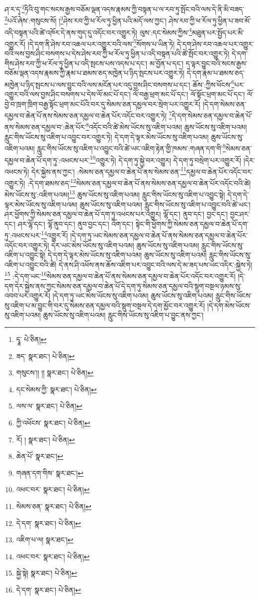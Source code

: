 ཤ་ར་དྭ་\footnote{དྭཱ་  པེ་ཅིན། }ཏིའི་བུ་གང་སངས་རྒྱས་བཅོམ་ལྡན་འདས་རྣམས་ཀྱི་བསྟན་པ་ལ་རབ་ཏུ་སྤོང་བའི་ལས་དེ་ནི་མི་བཟད་\footnote{ཟད་  སྣར་ཐང་།  པེ་ཅིན། }པའོ་ཞེས་:གསུངས་སོ། །\footnote{གསུངས་།། །།  སྣར་ཐང་།  པེ་ཅིན། }ཤེས་རབ་ཀྱི་ཕ་རོལ་ཏུ་ཕྱིན་པའི་མདོ་ལས་ཀྱང་། ཤེས་རབ་ཀྱི་ཕ་རོལ་ཏུ་ཕྱིན་པ་ཟབ་མོ་འདི་བསྟན་པའི་ཚེ་འཁོར་དེ་ནས་གུད་དུ་འདོང་བར་འགྱུར་ཏེ། ལུས་:དང་སེམས་ཀྱིས་\footnote{དང་སེམས་ཀྱི་  སྣར་ཐང་།  པེ་ཅིན། }མཐུན་པར་སྤྱོད་པར་མི་འགྱུར་རོ། །དེ་དག་ནི་ཤེས་རབ་འཆལ་པར་འགྱུར་བའི་ལས་\footnote{ལས་ལ་  སྣར་ཐང་།  པེ་ཅིན། }སོགས་པ་ཡིན་ཏེ། དེ་དག་ཤེས་རབ་འཆལ་པར་འགྱུར་བའི་ལས་བྱས་ཤིང་བསགས་པ་དེས་ཤེས་རབ་ཀྱི་ཕ་རོལ་ཏུ་ཕྱིན་པ་འདི་བསྟན་པའི་ཚེ་སྤོང་བར་འགྱུར་ཏེ། དེ་དག་གིས་ཤེས་རབ་ཀྱི་ཕ་རོལ་ཏུ་ཕྱིན་པ་འདི་སྤངས་པས་འདས་པ་དང་། མ་བྱོན་པ་དང་། ད་ལྟར་བྱུང་བའི་སངས་རྒྱས་བཅོམ་ལྡན་འདས་རྣམས་ཀྱི་རྣམ་པ་ཐམས་ཅད་མཁྱེན་པ་ཉིད་སྤངས་པར་འགྱུར་ཏེ། དེ་དག་རྣམ་པ་ཐམས་ཅད་མཁྱེན་པ་ཉིད་སྤངས་པ་ལས་བྱུང་བའི་ལས་མངོན་པར་འདུ་བྱས་ཤིང་བསགས་པ་དང་། ཆོས་:ཀྱིས་ཕོངས་\footnote{ཀྱི་འཕོངས་  སྣར་ཐང་།  པེ་ཅིན། }པར་འགྱུར་བའི་ལས་བྱས་ཤིང་བསགས་པ་དེས་ལོ་མང་པོ་དང་། ལོ་བརྒྱ་ཕྲག་མང་པོ་དང་། ལོ་སྟོང་ཕྲག་མང་པོ་དང་། ལོ་བྱེ་བ་ཁྲག་ཁྲིག་བརྒྱ་སྟོང་ཕྲག་མང་པོའི་བར་དུ་སེམས་ཅན་དམྱལ་བར་སྲེག་པར་འགྱུར་རོ། །དེ་དག་སེམས་ཅན་དམྱལ་བ་ཆེན་པོ་ནས་སེམས་ཅན་དམྱལ་བ་ཆེན་པོར་འདོང་བར་འགྱུར་ཏེ། \footnote{རོ། །   སྣར་ཐང་།  པེ་ཅིན། }དེ་དག་སེམས་ཅན་དམྱལ་བ་ཆེན་པོ་ནས་སེམས་ཅན་དམྱལ་བ་:ཆེན་པོར་\footnote{ཆེན་པོ་  སྣར་ཐང་། }འདོང་བའི་ཚེ་མེས་ཡོངས་སུ་འཇིག་པའམ། ཆུས་ཡོངས་སུ་འཇིག་པའམ། རླུང་གིས་ཡོངས་སུ་འཇིག་པ་འབྱུང་བར་འགྱུར་ཏེ། དེ་དག་དེ་ལྟར་མེས་ཡོངས་སུ་འཇིག་པའམ། ཆུས་ཡོངས་སུ་འཇིག་པའམ། རླུང་གིས་ཡོངས་སུ་འཇིག་པ་འབྱུང་བའི་ཚེ་ཡང་འཇིག་རྟེན་གྱི་ཁམས་:གཞན་དག་གི་\footnote{གཞན་དག་གིས་  སྣར་ཐང་། }སེམས་ཅན་དམྱལ་བ་ཆེན་པོ་དག་ཏུ་:འཕངས་པར་\footnote{འཕང་བར་  སྣར་ཐང་།  པེ་ཅིན། }འགྱུར་ཏེ། དེ་དག་ཏུ་སྐྱེ་བར་འགྱུར། དེ་དག་ཏུ་བསྲེག་པར་འགྱུར་རོ། །དེར་འཕངས་ཏེ། དེར་སྐྱེས་ནས་ཀྱང་། :སེམས་ཅན་དམྱལ་བ་ཆེན་པོ་ནས་སེམས་ཅན་\footnote{སེམས་ཅན་  སྣར་ཐང་།  པེ་ཅིན། }དམྱལ་བ་ཆེན་པོར་འདོང་བར་འགྱུར་ཏེ། :དེ་དག་ཐམས་ཅད་\footnote{དེ་དག་  སྣར་ཐང་།  པེ་ཅིན། }སེམས་ཅན་དམྱལ་བ་ཆེན་པོ་ནས་སེམས་ཅན་དམྱལ་བ་ཆེན་པོར་འདོང་བའི་ཚེ། མེས་ཡོངས་སུ་:འཇིག་པའམ།\footnote{འཇིག་པ་ལ།  སྣར་ཐང་། } ཆུས་ཡོངས་སུ་འཇིག་པའམ། རླུང་གིས་ཡོངས་སུ་འཇིག་པ་འབྱུང་སྟེ། དེ་དག་དེ་ལྟར་མེས་ཡོངས་སུ་འཇིག་པའམ། ཆུས་ཡོངས་སུ་འཇིག་པའམ། རླུང་གིས་ཡོངས་སུ་འཇིག་པ་འབྱུང་བའི་ཚེ་ཡང་། ཤར་ཕྱོགས་ཀྱི་སེམས་ཅན་དམྱལ་བ་ཆེན་པོ་དག་ཏུ་འཕངས་པར་འགྱུར། ལྷོ་དང་། ནུབ་དང་། བྱང་དང་། བྱང་ཤར་དང་། ཤར་ལྷོ་དང་། ལྷོ་ནུབ་དང་། ནུབ་བྱང་དང་། འོག་དང་། སྟེང་གི་ཕྱོགས་ཀྱི་སེམས་ཅན་དམྱལ་བ་ཆེན་པོ་དག་ཏུ་:འཕངས་པར་\footnote{འཕང་བར་  སྣར་ཐང་།  པེ་ཅིན། }འགྱུར་རོ། །དེ་དག་ཏུ་ཡང་སེམས་ཅན་དམྱལ་བ་ཆེན་པོ་ནས་སེམས་ཅན་དམྱལ་བ་ཆེན་པོར་འདོང་བར་འགྱུར་ཏེ། དེར་ཡང་མེས་ཡོངས་སུ་འཇིག་པའམ། ཆུས་ཡོངས་སུ་འཇིག་པའམ། རླུང་གིས་ཡོངས་སུ་འཇིག་པ་འབྱུང་སྟེ། དེ་དག་དེ་ལྟར་མེས་ཡོངས་སུ་འཇིག་པའམ། ཆུས་ཡོངས་སུ་འཇིག་པའམ། རླུང་གིས་ཡོངས་སུ་འཇིག་པ་འབྱུང་བའི་ཚེ། དེ་ནས་ཤི་འཕོས་ནས་ཆོས་འཇིག་པར་འབྱུང་བའི་ལས་དེ་མ་ཟད་པས་ཡང་འདིར་:སྐྱེས་ཏེ།\footnote{སྐྱེ་སྟེ།  སྣར་ཐང་།  པེ་ཅིན། } :དེ་དག་ཡང་\footnote{དེ་དག་  སྣར་ཐང་།  པེ་ཅིན། }སེམས་ཅན་དམྱལ་བ་ཆེན་པོ་ནས་སེམས་ཅན་དམྱལ་བ་ཆེན་པོར་འདོང་བར་འགྱུར་རོ། །དེ་དག་དེར་སྐྱེས་ནས་ཀྱང་སེམས་ཅན་དམྱལ་བ་ཆེན་པོ་དེ་དག་ཏུ་སེམས་ཅན་དམྱལ་བའི་སྡུག་བསྔལ་ཉམས་སུ་འབབ་པར་འགྱུར་རོ། །དེ་དག་ཏུ་ཡང་མེས་ཡོངས་སུ་འཇིག་པའམ། ཆུས་ཡོངས་སུ་འཇིག་པའམ། རླུང་གིས་ཡོངས་སུ་འཇིག་པ་མ་བྱུང་གི་བར་དུ་སེམས་ཅན་དམྱལ་བའི་སྡུག་བསྔལ་དེ་དག་མྱོང་བར་འགྱུར་རོ། །དེ་དག་མེས་ཡོངས་སུ་འཇིག་པའམ། ཆུས་ཡོངས་སུ་འཇིག་པའམ། རླུང་གིས་ཡོངས་སུ་འཇིག་པ་བྱུང་ནས་ཀྱང་། 